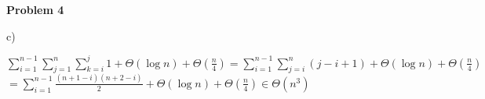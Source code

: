 \documentclass[12pt]{article}
\begin{document}
	
	\begin{center}
		{\Large\bf Problem 4}\\
		\vspace{3mm}
	\end{center}
	
	\def\question#1{\item[\bf #1.]}
	\def\part#1{\item[\bf #1)]}
	\newcommand{\pc}[1]{\mbox{\textbf{#1}}} %
	
	
	
	
	c)
	
	$\sum_{i = 1}^{n-1} \sum_{j=1}^{n} \sum_{k=i}^{j} 1 + \Theta(\log n) + \Theta(\frac{n}{4}) = \sum_{i = 1}^{n-1} \sum_{j=i}^{n} (j-i+1) + \Theta(\log n) + \Theta(\frac{n}{4})$\\
	$=\sum_{i = 1}^{n-1} \frac{(n+1-i)(n+2-i)}{2} + \Theta(\log n) + \Theta(\frac{n}{4}) \in \Theta(n^3) $\\
	
\end{document}
